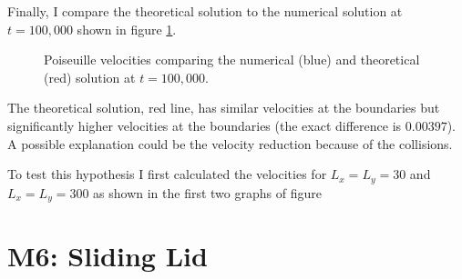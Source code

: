 \documentclass[a4paper,11pt, oneside]{book}
\begin{document}
Finally, I compare the theoretical solution to the numerical solution at $t=100,000$ shown in figure \ref{fig:m5-1-num-theo}.
\begin{figure}[ht]
\centering
\resizebox{0.7\columnwidth}{!}{\large}
\caption[Poiseuille numerical vs analytical]{Poiseuille velocities comparing the numerical (blue) and theoretical (red) solution at $t=100,000$.}
\label{fig:m5-1-num-theo}
\end{figure}
The theoretical solution, red line, has similar velocities at the boundaries but significantly higher velocities at the boundaries (the exact difference is $0.00397$).
A possible explanation could be the velocity reduction because of the collisions.

To test this hypothesis I first calculated the velocities for $L_x=L_y=30$ and $L_x=L_y=300$ as shown in the first two graphs of figure \fi



\section{M6: Sliding Lid}





% 
\end{document}
